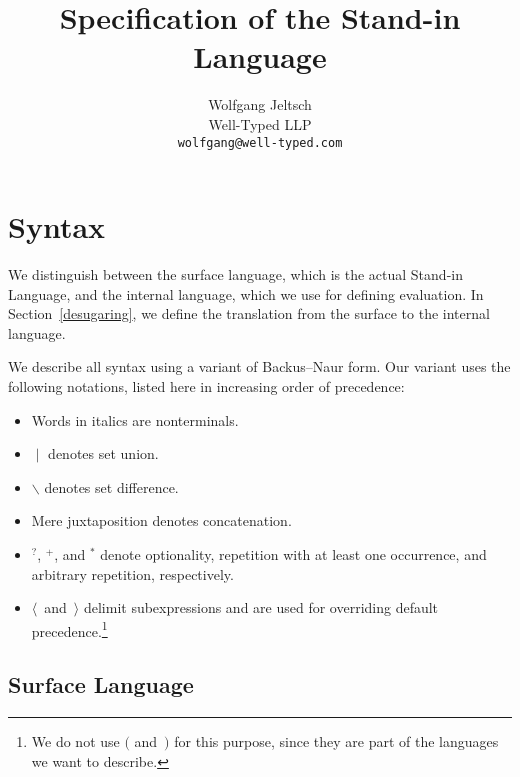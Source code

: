 \documentclass{scrartcl}
\title{Specification of the Stand-in Language}
\author{%
    Wolfgang Jeltsch\\
    \small Well-Typed LLP\\
    \small\texttt{wolfgang@well-typed.com}%
}
\newcommand{\optional}{^?}
\newcommand{\some}{^+}
\newcommand{\many}{^*}
\begin{document}
\maketitle

\section{Syntax}

We distinguish between the surface language, which is the actual
Stand-in Language, and the internal language, which we use for defining
evaluation. In Section~\ref{desugaring}, we define the translation from
the surface to the internal language.

We describe all syntax using a variant of Backus–Naur form. Our variant
uses the following notations, listed here in increasing order of
precedence:
\begin{itemize}

\item

Words in italics are nonterminals.

\item

$∣$ denotes set union.

\item

$∖$ denotes set difference.

\item

Mere juxtaposition denotes concatenation.

\item

$\optional$, $\some$, and $\many$ denote optionality, repetition with at
least one occurrence, and arbitrary repetition, respectively.

\item

$⟨$~and~$⟩$ delimit subexpressions and are used for overriding default
precedence.\footnote{We do not use $($ and~$)$ for this purpose, since
they are part of the languages we want to describe.}

\end{itemize}

\subsection{Surface Language}
\end{document}

